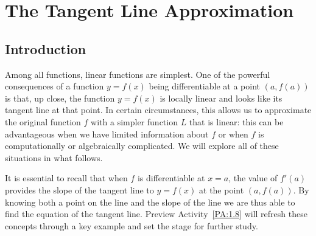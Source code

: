 \section{The Tangent Line Approximation} \label{S:1.8.TanLineApprox}

\vspace*{-14 pt}

\subsection*{Introduction}

Among all functions, linear functions are simplest.  One of the powerful consequences of a function $y = f(x)$ being differentiable at a point $(a,f(a))$ is that, up close, the function $y = f(x)$ is locally linear and looks like its tangent line at that point.  In certain circumstances, this allows us to approximate the original function $f$ with a simpler function $L$ that is linear: this can be advantageous when we have limited information about $f$ or when $f$ is computationally or algebraically complicated.  We will explore all of these situations in what follows.

It is essential to recall that when $f$ is differentiable at $x = a$, the value of $f'(a)$ provides the slope of the tangent line to $y = f(x)$ at the point $(a,f(a))$.  By knowing both a point on the line and the slope of the line we are thus able to find the equation of the tangent line.  Preview Activity~\ref{PA:1.8} will refresh these concepts through a key example and set the stage for further study.



